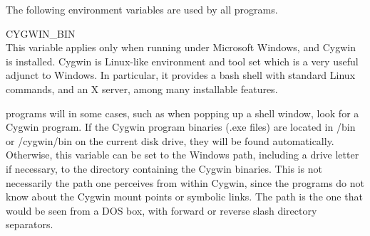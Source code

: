 The following environment variables are used by all {\XicTools}
programs.

\begin{description}
\item{\et CYGWIN\_BIN}\\
This variable applies only when running under Microsoft Windows, and
Cygwin is installed.  Cygwin is Linux-like environment and tool set
which is a very useful adjunct to Windows.  In particular, it provides
a bash shell with standard Linux commands, and an X server, among many
installable features.

{\XicTools} programs will in some cases, such as when popping up a
shell window, look for a Cygwin program.  If the Cygwin program
binaries ({\vt .exe} files) are located in {\vt /bin} or {\vt
/cygwin/bin} on the current disk drive, they will be found
automatically.  Otherwise, this variable can be set to the Windows
path, including a drive letter if necessary, to the directory
containing the Cygwin binaries.  This is not necessarily the path one
perceives from within Cygwin, since the {\XicTools} programs do not
know about the Cygwin mount points or symbolic links.  The path is the
one that would be seen from a DOS box, with forward or reverse slash
directory separators.


\end{description}
